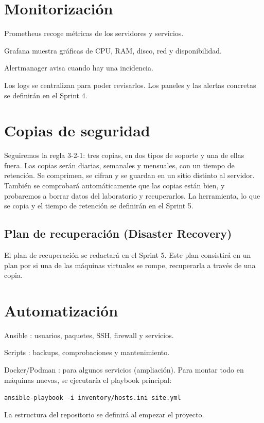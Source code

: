 \documentclass[11pt,a4paper]{report}
\begin{document}
\chapter{Monitorización}

\par\noindent\textbullet\quad  Prometheus recoge métricas de los servidores y servicios. 
\par\noindent\textbullet\quad  Grafana muestra gráficas de CPU, RAM, disco, red y disponibilidad. 
\par\noindent\textbullet\quad  Alertmanager avisa cuando hay una incidencia. 
\par\noindent\textbullet\quad  Los logs se centralizan para poder revisarlos. Los paneles y las alertas concretas se definirán en el Sprint 4.

\chapter{Copias de seguridad}
Seguiremos la regla 3-2-1: tres copias, en dos tipos de soporte y una de ellas fuera. Las copias serán diarias, semanales y mensuales, con un tiempo de retención. Se comprimen, se cifran y se guardan en un sitio distinto al servidor. También se comprobará automáticamente que las copias están bien, y probaremos a borrar datos del laboratorio y recuperarlos. La herramienta, lo que se copia y el tiempo de retención se definirán en el Sprint 5. 
\section{Plan de recuperación (Disaster Recovery)}
 El plan de recuperación se redactará en el Sprint 5. Este plan consistirá en un plan por si una de las máquinas virtuales se rompe, recuperarla a través de una copia.

\chapter{Automatización}

\par\noindent\textbullet\quad  Ansible : usuarios, paquetes, SSH, firewall y servicios. 
\par\noindent\textbullet\quad  Scripts : backups, comprobaciones y mantenimiento. 
\par\noindent\textbullet\quad  Docker/Podman : para algunos servicios (ampliación). Para montar todo en máquinas nuevas, se ejecutaría el playbook principal: \par\texttt{ansible-playbook -i inventory/hosts.ini site.yml}\par La estructura del repositorio se definirá al empezar el proyecto.
\end{document}
